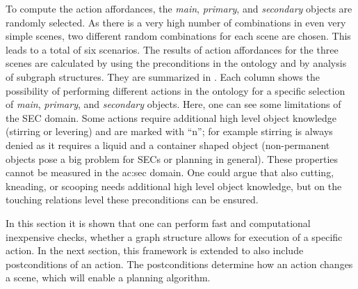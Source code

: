 To compute the action affordances, the \emph{main}, \emph{primary}, and \emph{secondary} objects are randomly selected.
As there is a very high number of combinations in even very simple scenes, two different random combinations for each scene are chosen.
This leads to a total of six scenarios.
The results of action affordances for the three scenes are calculated by using the preconditions in the ontology and by analysis of subgraph structures.
They are summarized in .
Each column shows the possibility of performing different actions in the ontology for a specific selection of \emph{main}, \emph{primary}, and \emph{secondary} objects.
Here, one can see some limitations of the SEC domain.
Some actions require additional high level object knowledge (\eg stirring or levering) and are marked with ``n'';
for example stirring is always denied as it requires a liquid and a container shaped object (non-permanent objects pose a big problem for SECs or planning in general).
These properties cannot be measured in the \gls{ac:sec} domain.
One could argue that also cutting, kneading, or scooping needs additional high level object knowledge, but on the touching relations level these preconditions can be ensured.


In this section it is shown that one can perform fast and computational inexpensive checks, whether a graph structure allows for execution of a specific action.
In the next section, this framework is extended to also include postconditions of an action.
The postconditions determine how an action changes a scene, which will enable a planning algorithm.


